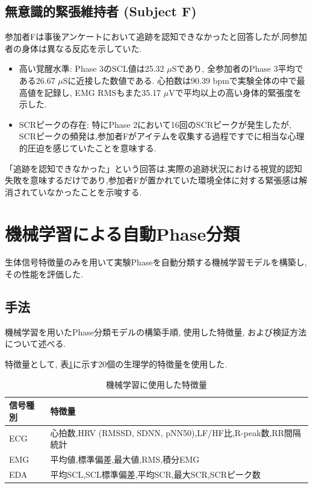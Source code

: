 \documentclass[book,paper=a4,fontsize=10pt,jafontscale=0.92]{jlreq}
\begin{document}
\subsection{無意識的緊張維持者 (Subject F)}
参加者Fは事後アンケートにおいて追跡を認知できなかったと回答したが,同参加者の身体は異なる反応を示していた.
\begin{itemize}
\item {高い覚醒水準}: Phase 3のSCL値は25.32 $\mu$Sであり, 全参加者のPhase 3平均である26.67 $\mu$Sに近接した数値である. 心拍数は90.39 bpmで実験全体の中で最高値を記録し, EMG RMSもまた35.17 $\mu$Vで平均以上の高い身体的緊張度を示した.
\item {SCRピークの存在}: 特にPhase 2において16回のSCRピークが発生したが, SCRピークの頻発は,参加者Fがアイテムを収集する過程ですでに相当な心理的圧迫を感じていたことを意味する.
\end{itemize}
「追跡を認知できなかった」という回答は,実際の追跡状況における視覚的認知失敗を意味するだけであり,参加者Fが置かれていた環境全体に対する緊張感は解消されていなかったことを示唆する.

\section{機械学習による自動Phase分類}

生体信号特徴量のみを用いて実験Phaseを自動分類する機械学習モデルを構築し,その性能を評価した.

\subsection{手法}
機械学習を用いたPhase分類モデルの構築手順, 使用した特徴量, および検証方法について述べる.

特徴量として, 表\ref{tab:ml_features}に示す20個の生理学的特徴量を使用した.

\begin{table}[t]
\centering
\caption{機械学習に使用した特徴量}
\label{tab:ml_features}
\begin{tabular}{ll}
\hline
信号種別 & 特徴量 \\
\hline
ECG & 心拍数,HRV (RMSSD, SDNN, pNN50),LF/HF比,R-peak数,RR間隔統計 \\
EMG & 平均値,標準偏差,最大値,RMS,積分EMG \\
EDA & 平均SCL,SCL標準偏差,平均SCR,最大SCR,SCRピーク数 \\
\hline
\end{tabular}
\end{table}
\end{document}

